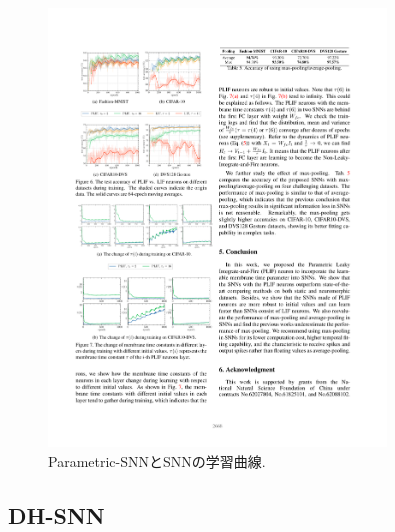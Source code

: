 \begin{figure}[htbp]
    \centering
    \includegraphics[width=0.8\textwidth]{Static/chap1_paramsnn_traincurve.pdf}
    \caption{
        Parametric-SNNとSNNの学習曲線\cite{paramsnn}.
    }
    \label{fig:paramsnn:traincurve}
\end{figure}


\subsection{DH-SNN}
